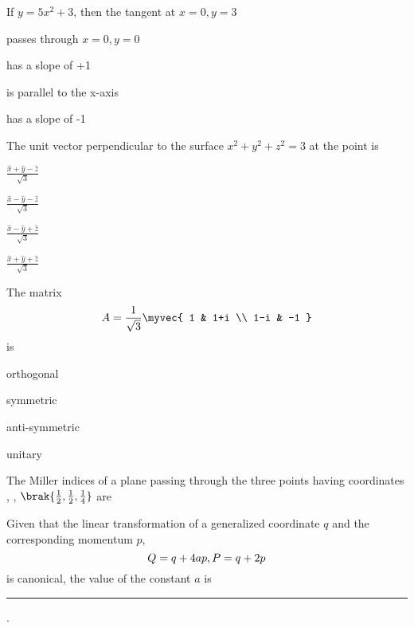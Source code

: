 \item If $y = 5x^2 + 3$, then the tangent at $x = 0, y = 3$
\hfill{} \begin{enumerate} \begin{multicols}{2}
    \item passes through $x = 0, y = 0$
    \item has a slope of +1
    \item is parallel to the x-axis
    \item has a slope of -1
\end{multicols} \end{enumerate}


\item The unit vector perpendicular to the surface $x^2+y^2+z^2 = 3$ at the point  is
 \begin{enumerate} \begin{multicols}{4}
    \item $\frac{\hat{x}+\hat{y}-\hat{z}}{\sqrt{3}}$
    \item $\frac{\hat{x}-\hat{y}-\hat{z}}{\sqrt{3}}$
    \item $\frac{\hat{x}-\hat{y}+\hat{z}}{\sqrt{3}}$
    \item $\frac{\hat{x}+\hat{y}+\hat{z}}{\sqrt{3}}$
\end{multicols} \end{enumerate}
\hfill{}
\item The matrix $$A = \frac{1}{\sqrt{3}} \myvec{ 1 & 1+i \\ 1-i & -1 }$$ is
\hfill{} \begin{enumerate} \begin{multicols}{4}
    \item orthogonal
    \item symmetric
    \item anti-symmetric
    \item unitary
\end{multicols} \end{enumerate}

\item The Miller indices of a plane passing through the three points having coordinates , , $\brak{\frac{1}{2}, \frac{1}{2}, \frac{1}{4}}$ are
\hfill{} \begin{enumerate} \begin{multicols}{4}
    \item {}
    \item {}
    \item {}
    \item {}
\end{multicols} \end{enumerate}

\item Given that the linear transformation of a generalized coordinate $q$ and the corresponding momentum $p$, $$Q = q + 4ap, \\P = q + 2p$$ is canonical, the value of the constant $a$ is \rule{3cm}{0.4pt}.\hfill{}

